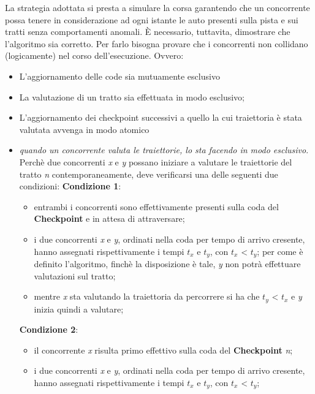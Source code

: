 La strategia adottata si presta a simulare la corsa garantendo che un concorrente possa tenere in considerazione ad
ogni istante le auto presenti sulla pista e sui tratti senza comportamenti
anomali. \`{E} necessario, tuttavita, dimostrare che l'algoritmo sia corretto. Per farlo bisogna provare che i concorrenti
non collidano (logicamente) nel corso dell'esecuzione. Ovvero:
\begin{itemize}
\item L'aggiornamento delle code sia mutuamente esclusivo
\item La valutazione di un tratto sia effettuata in modo esclusivo;
\item L'aggiornamento dei checkpoint successivi a quello la cui traiettoria è stata valutata avvenga in modo atomico 
\end{itemize}
\begin{itemize}
\item \emph{quando un concorrente valuta le traiettorie, lo sta facendo in modo
esclusivo}.
Perchè due concorrenti \emph{x} e \emph{y} possano iniziare a valutare le traiettorie del tratto \emph{n}
contemporaneamente, deve verificarsi una delle seguenti due condizioni:
\textbf{Condizione 1}:\\
\begin{itemize}
\item entrambi i concorrenti sono effettivamente presenti sulla coda del \textbf{Checkpoint} e in attesa di attraversare;
\item i due concorrenti \emph{x} e \emph{y}, ordinati nella coda per tempo di arrivo cresente, hanno assegnati rispettivamente i tempi
\emph{$t_x$} e \emph{$t_y$}, con $t_x$ < $t_y$; per come è definito l'algoritmo, finchè la disposizione è tale, \emph{y} non potrà effettuare
valutazioni sul tratto;
\item mentre \emph{x} sta valutando la traiettoria da percorrere%
si ha che $t_y$ < $t_x$ e \emph{y} inizia quindi a valutare;
\end{itemize}
\textbf{Condizione 2}:\\
\begin{itemize}
\item il concorrente \emph{x} risulta primo effettivo sulla coda del \textbf{Checkpoint} \emph{n}; 
\item i due concorrenti \emph{x} e \emph{y}, ordinati nella coda per tempo di arrivo cresente, hanno assegnati rispettivamente i tempi
\emph{$t_x$} e \emph{$t_y$}, con $t_x$ < $t_y$; 

\end{itemize}
\end{itemize}
